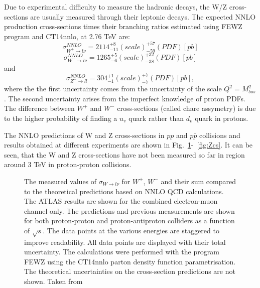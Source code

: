 Due to experimental difficulty to measure the hadronic decays, the  W/Z cross-sections are usually measured through their leptonic decays. The expected NNLO production cross-sections times their branching ratios estimated using FEWZ program\cite{FEWZ} and CT14nnlo\cite{CT14}, at 2.76 TeV are:
\begin{equation}\label{eq:WcsNNLO}
\sigma^{NNLO}_{W^+ \to l \nu} = 2114^{+8}_{-11}(scale)^{+57}_{-59}(PDF) [pb]
\end{equation}
\begin{equation}
\sigma^{NNLO}_{W^- \to l \nu} = 1265^{+5}_{-6}(scale)^{+32}_{-38}(PDF) [pb]
\end{equation}
and 
\begin{equation}\label{eq:ZcsNNLO}
\sigma^{NNLO}_{Z^- \to ll} = 304^{+1}_{-1}(scale)^{+7}_{-7}(PDF) [pb],
\end{equation}
where the the first uncertainty comes from the uncertainty of the scale $Q^2=M_{bos}^2$. The second uncertainty arises from the imperfect knowledge of proton PDFs. The difference between $W^{+}$ and $W^{-}$ cross-sections (called chare assymetry) is due to  the higher probability of finding a $u_v$ quark rather than $d_v$ quark in protons.

The NNLO predictions of W and Z cross-sections in $pp$ and $p\bar{p}$ collisions and results obtained at different experiments are shown in Fig.~\ref{fig:Wcs}-~\ref{fig:Zcs}. It can be seen, that the W and Z cross-sections have not been measured so far in region around 3 TeV in proton-proton collisions.


\begin{figure}[!tbp]


\caption{The measured values of $\sigma_{W \to l\nu}$ for $W^+$, $W^-$ and  their sum compared to the theoretical predictions based on NNLO QCD calculations. The ATLAS results are shown for the combined electron-muon channel only. The predictions and previous measurements are shown for both proton-proton and proton-antiproton colliders as a function of $\sqrt{s}$. The data points at the various energies are staggered to improve readability. All data points are displayed with their total uncertainty. The calculations were performed with the program FEWZ using the CT14nnlo parton density function parametrisation. The theoretical uncertainties on the cross-section predictions are not shown. Taken from \cite{a13TeV}}
\label{fig:Wcs}
\end{figure}

